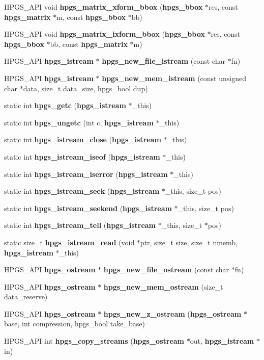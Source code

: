 \begin{DoxyCompactItemize}
\item 
HPGS\_\-API void {\bf hpgs\_\-matrix\_\-xform\_\-bbox} ({\bf hpgs\_\-bbox} $\ast$res, const {\bf hpgs\_\-matrix} $\ast$m, const {\bf hpgs\_\-bbox} $\ast$bb)
\item 
HPGS\_\-API void {\bf hpgs\_\-matrix\_\-ixform\_\-bbox} ({\bf hpgs\_\-bbox} $\ast$res, const {\bf hpgs\_\-bbox} $\ast$bb, const {\bf hpgs\_\-matrix} $\ast$m)
\item 
HPGS\_\-API {\bf hpgs\_\-istream} $\ast$ {\bf hpgs\_\-new\_\-file\_\-istream} (const char $\ast$fn)
\item 
HPGS\_\-API {\bf hpgs\_\-istream} $\ast$ {\bf hpgs\_\-new\_\-mem\_\-istream} (const unsigned char $\ast$data, size\_\-t data\_\-size, hpgs\_\-bool dup)
\item 
static int {\bf hpgs\_\-getc} ({\bf hpgs\_\-istream} $\ast$\_\-this)
\item 
static int {\bf hpgs\_\-ungetc} (int c, {\bf hpgs\_\-istream} $\ast$\_\-this)
\item 
static int {\bf hpgs\_\-istream\_\-close} ({\bf hpgs\_\-istream} $\ast$\_\-this)
\item 
static int {\bf hpgs\_\-istream\_\-iseof} ({\bf hpgs\_\-istream} $\ast$\_\-this)
\item 
static int {\bf hpgs\_\-istream\_\-iserror} ({\bf hpgs\_\-istream} $\ast$\_\-this)
\item 
static int {\bf hpgs\_\-istream\_\-seek} ({\bf hpgs\_\-istream} $\ast$\_\-this, size\_\-t pos)
\item 
static int {\bf hpgs\_\-istream\_\-seekend} ({\bf hpgs\_\-istream} $\ast$\_\-this, size\_\-t pos)
\item 
static int {\bf hpgs\_\-istream\_\-tell} ({\bf hpgs\_\-istream} $\ast$\_\-this, size\_\-t $\ast$pos)
\item 
static size\_\-t {\bf hpgs\_\-istream\_\-read} (void $\ast$ptr, size\_\-t size, size\_\-t nmemb, {\bf hpgs\_\-istream} $\ast$\_\-this)
\item 
HPGS\_\-API {\bf hpgs\_\-ostream} $\ast$ {\bf hpgs\_\-new\_\-file\_\-ostream} (const char $\ast$fn)
\item 
HPGS\_\-API {\bf hpgs\_\-ostream} $\ast$ {\bf hpgs\_\-new\_\-mem\_\-ostream} (size\_\-t data\_\-reserve)
\item 
HPGS\_\-API {\bf hpgs\_\-ostream} $\ast$ {\bf hpgs\_\-new\_\-z\_\-ostream} ({\bf hpgs\_\-ostream} $\ast$base, int compression, hpgs\_\-bool take\_\-base)
\item 
HPGS\_\-API int {\bfseries hpgs\_\-copy\_\-streams} ({\bf hpgs\_\-ostream} $\ast$out, {\bf hpgs\_\-istream} $\ast$in)\label{group__base_ga74770e20d2f627732e67d5e60750ab15}


\end{DoxyCompactItemize}
